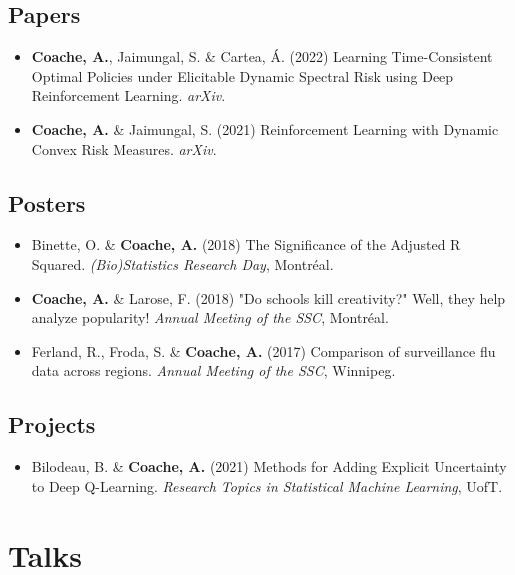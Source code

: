 \documentclass[11pt, sans]{moderncv}
\begin{document}
\subsection{Papers }

\begin{itemize}
	\item \textbf{Coache, A.}, Jaimungal, S. \& Cartea, Á. (2022) Learning Time-Consistent Optimal Policies under Elicitable Dynamic Spectral Risk using Deep Reinforcement Learning. \textit{arXiv}.
	\item \textbf{Coache, A.} \& Jaimungal, S. (2021) Reinforcement Learning with Dynamic Convex Risk Measures. \textit{arXiv}.
\end{itemize}

\vspace{5pt}
\subsection{Posters }

\begin{itemize}
    \item Binette, O. \& \textbf{Coache, A.} (2018) The Significance of the Adjusted R Squared. \textit{(Bio)Statistics Research Day}, Montréal.
    \item \textbf{Coache, A.} \& Larose, F. (2018) "Do schools kill creativity?" Well, they help analyze popularity! \textit{Annual Meeting of the SSC}, Montréal.
    \item Ferland, R., Froda, S. \& \textbf{Coache, A.} (2017) Comparison of surveillance flu data across regions. \textit{Annual Meeting of the SSC}, Winnipeg.
\end{itemize}

\vspace{5pt}
\subsection{Projects }

\begin{itemize}
       \item Bilodeau, B. \& \textbf{Coache, A.} (2021) Methods for Adding Explicit Uncertainty to Deep Q-Learning. \textit{Research Topics in Statistical Machine Learning}, UofT.
\end{itemize}


\section{Talks  }
\end{document}
